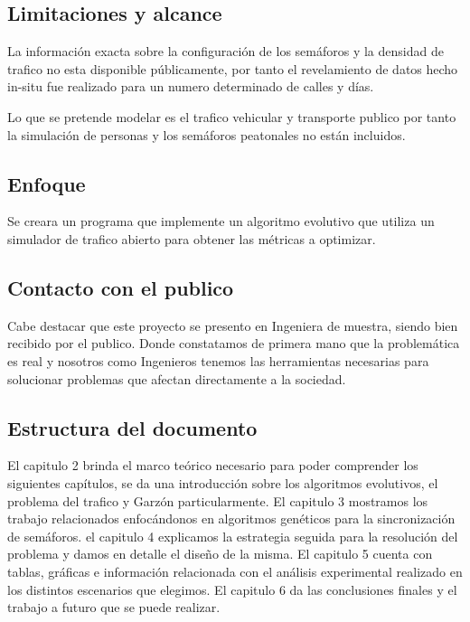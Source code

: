 \subsection{Limitaciones y alcance}
La información exacta sobre la configuración de los semáforos y la densidad de trafico no esta disponible públicamente, por tanto el revelamiento de datos hecho in-situ fue realizado para un numero determinado de calles y días.

Lo que se pretende modelar es el trafico vehicular y transporte publico por tanto la simulación de personas y los semáforos peatonales no están incluidos.

 
\subsection{Enfoque}
Se creara un programa que implemente un algoritmo evolutivo  que utiliza un simulador de trafico abierto para obtener las métricas a optimizar.


\subsection{Contacto con el publico}
Cabe destacar que este proyecto se presento en Ingeniera de muestra, siendo bien recibido por el publico. Donde constatamos de primera mano que la problemática es real y nosotros como Ingenieros tenemos las herramientas necesarias para solucionar problemas que afectan directamente a la sociedad.

\subsection{Estructura del documento}
El capitulo 2 brinda el marco teórico necesario para poder comprender los siguientes capítulos, se da una introducción sobre los algoritmos evolutivos, el problema del trafico y Garzón particularmente.
El capitulo 3 mostramos los trabajo relacionados enfocándonos en algoritmos genéticos para la sincronización de semáforos.
el capitulo 4 explicamos la estrategia seguida para la resolución del problema y damos en detalle el diseño de la misma.
El capitulo 5 cuenta con tablas, gráficas e información relacionada con el análisis experimental realizado en los distintos escenarios que elegimos.
El capitulo 6 da las conclusiones finales y el trabajo a futuro que se puede realizar.






